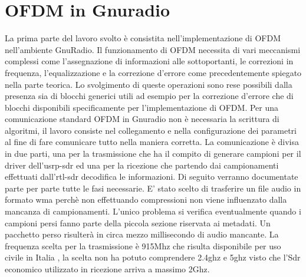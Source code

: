 \chapter{OFDM in Gnuradio}
\label{cha:789}
La prima parte del lavoro svolto è consistita nell'implementazione di OFDM nell'ambiente GnuRadio. Il funzionamento di OFDM necessita di vari meccanismi complessi come l'assegnazione di informazioni alle sottoportanti, le correzioni in frequenza, l'equalizzazione e la correzione d'errore come precedentemente spiegato nella parte teorica. Lo svolgimento di queste operazioni sono rese possibili dalla presenza sia di blocchi generici utili ad esempio per la correzione d'errore che di blocchi disponibili specificamente per l'implementazione di OFDM. Per una comunicazione standard OFDM in Gnuradio non è necessaria la scrittura di algoritmi, il lavoro consiste nel collegamento e nella configurazione dei parametri al fine di fare comunicare tutto nella maniera corretta.
La comunicazione è divisa in due parti, una per la trasmissione che ha il compito di generare campioni per il driver dell'usrp-sdr ed una per la ricezione che partendo dai campionamenti effettuati dall'rtl-sdr decodifica le informazioni. Di seguito verranno documentate parte per parte tutte le fasi necessarie.
E' stato scelto di trasferire un file audio in formato wma perchè non effettuando compressioni non viene influenzato dalla mancanza di campionamenti. L'unico problema si verifica eventualmente quando i campioni persi fanno parte della piccola sezione riservata ai metadati. Un pacchetto perso risulterà in circa mezzo millisecondo di audio mancante. La frequenza scelta per la trasmissione è 915Mhz che risulta disponibile per uso civile in Italia \cite{frequenze}, la scelta non ha potuto comprendere 2.4ghz e 5ghz visto che l'Sdr economico utilizzato in ricezione arriva a massimo 2Ghz.
